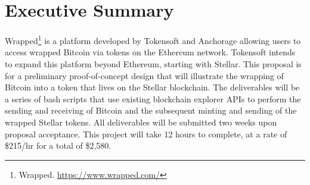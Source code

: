 \section{Executive Summary}
Wrapped\footnote{Wrapped. \url{https://www.wrapped.com/}} is a platform developed by Tokensoft and Anchorage allowing users to access wrapped Bitcoin via tokens on the Ethereum network.
Tokensoft intends to expand this platform beyond Ethereum, starting with Stellar.
This proposal is for a preliminary proof-of-concept design that will illustrate the wrapping of Bitcoin into a token that lives on the Stellar blockchain.
The deliverables will be a series of bash scripts that use existing blockchain explorer APIs to perform the sending and receiving of Bitcoin and the subsequent minting and sending of the wrapped Stellar tokens.
All deliverables will be submitted two weeks upon proposal acceptance. This project will take 12 hours to complete, at a rate of \$215/hr for a total of \$2,580.
